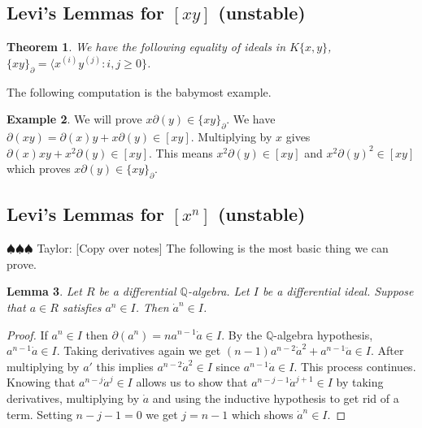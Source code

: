 \documentclass[12pt]{book}
\newcommand{\taylor}[1]{{\color{blue} \sf $\spadesuit\spadesuit\spadesuit$ Taylor: [#1]}}
\numberwithin{equation}{section}
\newtheorem{theorem}{Theorem}[subsection]
\newtheorem{lemma}[theorem]{Lemma}
\theoremstyle{definition}
\newtheorem{example}[theorem]{Example}
\theoremstyle{remark}
\newcommand{\QQ}{\mathbb{Q}}
\begin{document}
\subsection{Levi's Lemmas for $[xy]$ (unstable) }

\begin{theorem}
	We have the following equality of ideals in $K\lbrace x,y\rbrace$,
	$\lbrace xy\rbrace_{\partial} = \langle x^{(i)}y^{(j)} \colon i,j \geq 0 \rbrace$.
\end{theorem}

The following computation is the babymost example. 
\begin{example}
	We will prove $x\partial(y) \in \lbrace xy\rbrace_{\partial}$.
	We have $\partial(xy) = \partial(x)y+x\partial(y) \in [xy]$.
	Multiplying by $x$ gives $\partial(x)xy + x^2\partial(y) \in [xy]$.
	This means $x^2\partial(y) \in [xy] $ and $x^2\partial(y)^2 \in [xy]$ which proves $x\partial(y) \in \lbrace xy\rbrace_{\partial}$.
\end{example}

\subsection{Levi's Lemmas for $[x^n]$ (unstable) }

\taylor{Copy over notes}
The following is the most basic thing we can prove. 
\begin{lemma}\label{lem:power-lemma}
	Let $R$ be a differential $\QQ$-algebra. 
	Let $I$ be a differential ideal. 
	Suppose that $a\in R$ satisfies $a^n \in I$. 
	Then $\dot{a}^{n} \in I$. 
\end{lemma}
\begin{proof}
	If $a^n \in I$ then $\partial(a^n) = n a^{n-1} \dot{a}\in I$. 
	By the $\QQ$-algebra hypothesis, $a^{n-1}\dot{a}\in I$. 
	Taking derivatives again we get $(n-1)a^{n-2}\dot{a}^2 + a^{n-1}\ddot{a}\in I.$
	After multiplying by $a'$ this implies $a^{n-2} \dot{a}^2 \in I$ since $a^{n-1}\dot{a} \in I$.
	This process continues. 
	Knowing that $a^{n-j}\dot{a}^j \in I$ allows us to show that $a^{n-j-1}\dot{a}^{j+1} \in I$ by taking derivatives, multiplying by $\dot{a}$ and using the inductive hypothesis to get rid of a term. 
	Setting $n-j-1=0$ we get $j=n-1$ which shows $\dot{a}^n \in I$.
\end{proof}
\end{document}
